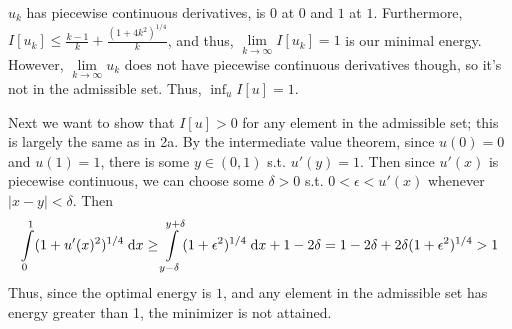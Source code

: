 \begin{enumerate}
  $u_k$ has piecewise continuous derivatives, is $0$ at $0$ and $1$ at $1$.
  Furthermore, $I[u_k] \leq \frac{k - 1}{k} + \frac{(1 + 4 k^2)^{1/4}}{k}$,
  and thus, $\lim \limits_{k \rightarrow \infty} I[u_k] = 1$ is our minimal energy.
  However, $\lim \limits_{k \rightarrow \infty} u_k$ does not have piecewise continuous derivatives though, so it's not in the admissible set.
  Thus, $\inf_{u} I[u] = 1$.

  Next we want to show that $I[u] > 0$ for any element in the admissible set; this is largely the same as in 2a.
  By the intermediate value theorem, since $u(0) = 0$ and $u(1) = 1$, there is some $y \in (0, 1)$ s.t. $u'(y) = 1$.
  Then since $u'(x)$ is piecewise continuous, we can choose some $\delta > 0$ s.t. $0 < \epsilon < u'(x)$ whenever $|x - y| < \delta$.
  Then
  $$
  \int \limits_{0}^{1} (1 + u'(x)^2)^{1/4} \;\mathrm{d}x \geq \int \limits_{y - \delta}^{y + \delta} (1 + \epsilon^2)^{1/4} \;\mathrm{d}x + 1 - 2 \delta
  = 1 - 2 \delta + 2 \delta (1 + \epsilon^2)^{1/4} > 1
  $$
  Thus, since the optimal energy is $1$, and any element in the admissible set has energy greater than 1, the minimizer is not attained.
\end{enumerate}
